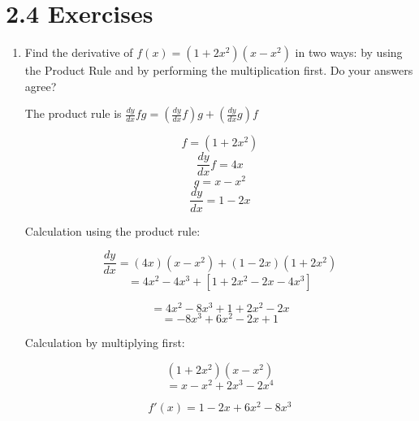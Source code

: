 \documentclass{article}
\begin{document}
	\section{2.4 Exercises}

	\begin{enumerate}
		\item Find the derivative of $f(x) = (1+2x^2)(x-x^2)$ in two
			ways: by using the Product Rule and by performing the
			multiplication first. Do your answers agree?

			The product rule is $\frac{dy}{dx} fg = (\frac{dy}{dx}f)g + (\frac{dy}{dx}g)f$

			$$f = (1 + 2x^2)$$
			$$\frac{dy}{dx}f = 4x$$
			$$g = x - x^2$$
			$$\frac{dy}{dx} = 1 - 2x$$

			Calculation using the product rule:

			$$\frac{dy}{dx} = (4x)(x-x^2) + (1-2x)(1+2x^2)$$
			$$ = 4x^2 - 4x^3 + [1 + 2x^2 - 2x - 4x^3]$$

			$$ = 4x^2 - 8x^3 + 1 + 2x^2 - 2x$$
			$$ = -8x^3 + 6x^2 - 2x + 1$$

			Calculation by multiplying first:

			$$(1+2x^2)(x-x^2)$$
			$$ = x - x^2 + 2x^3 - 2x^4$$

			$$ f'(x) = 1 - 2x + 6x^2 - 8x^3$$
	\end{enumerate}
\end{document}
